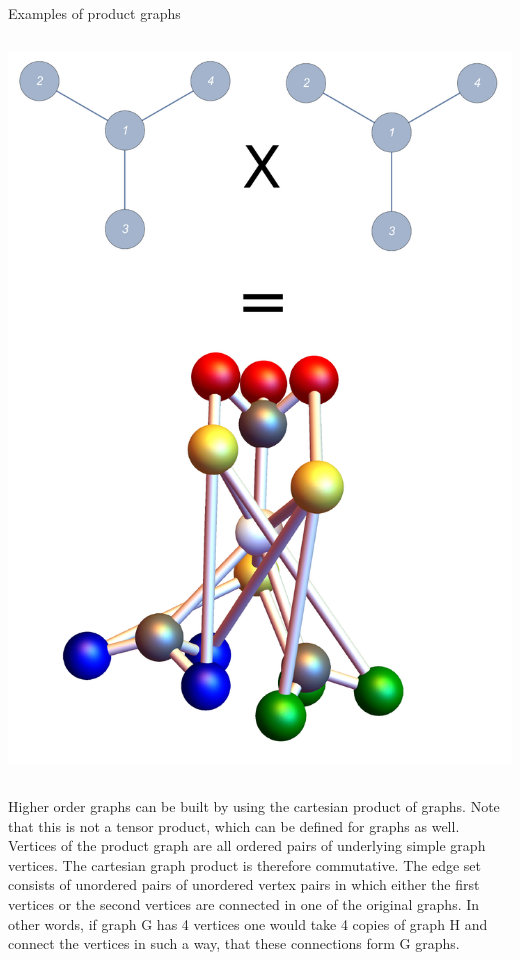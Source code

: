 {\begin{frame}{Examples of product graphs}
\begin{columns}[T]
{\begin{column}{0.33\textwidth}
     		\includegraphics[trim=30mm 0 0 0, width=\textwidth]{Images/graphprod_switch_square}
		\end{column}}
	\end{columns}
\end{frame}}

\begin{center}
\end{center}

\noindent Higher order graphs can be built by using the cartesian product of graphs\cite{Sabidussi1959}. Note that this is not a tensor product, which can be defined for graphs as well. Vertices of the product graph are all ordered pairs of underlying simple graph vertices. The cartesian graph product is therefore commutative. The edge set consists of unordered pairs of unordered vertex pairs in which either the first vertices or the second vertices are connected in one of the original graphs. In other words, if graph G has 4 vertices one would take 4 copies of graph H and connect the vertices in such a way, that these connections form G graphs. 

